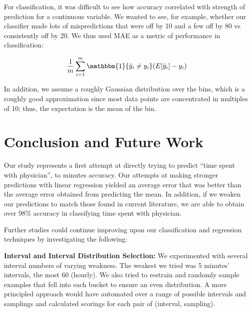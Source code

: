 \documentclass[english]{article}
\begin{document}
For classification, it was difficult to see how accuracy correlated with strength of prediction for a continuous variable. We wanted to see, for example, whether our classifier made lots of mispredictions that were off by 10 and a few off by 80 vs consistently off by 20. We thus used MAE as a metric of performance in classification:

$$
\frac{1}{m}\sum_{i=1}^{m} \mathbbm{1}\{\hat{y}_i \neq y_i\}(E[\hat{y}_i] - y_i)
$$

In addition, we assume a roughly Gaussian distribution over the bins, which is a roughly good approximation since most data points are concentrated in multiples of 10; thus, the expectation is the mean of the bin.


\section{Conclusion and Future Work}

Our study represents a first attempt at directly trying to predict ``time spent with physician'', to minutes accuracy.
Our attempts at making stronger predictions with linear regression yielded an average error that was better than the average error obtained from predicting the mean.
In addition, if we weaken our predictions to match those found in current literature, we are able to obtain over 98\% accuracy in classifying time spent with physician. 

Further studies could continue improving upon our classification and regression techniques by investigating the following:

{\bf Interval and Interval Distribution Selection:}
We experimented with several interval numbers of varying weakness.
The weakest we tried was 5 minutes' intervals, the most 60 (hourly).
We also tried to restrain and randomly sample examples that fell into each bucket to ensure an even distribution.
A more principled approach would have automated over a range of possible intervals and samplings and calculated scorings for each pair of (interval, sampling).

\end{document}
